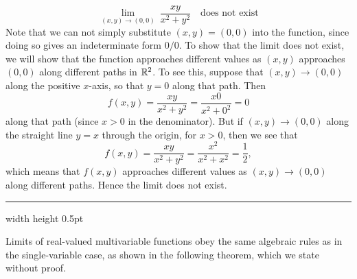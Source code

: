 \begin{exmp}
 \begin{displaymath}
 \lim_{(x,y) \to (0,0)}~ \frac{xy}{x^2 + y^2} \text{~~~does not exist}
 \end{displaymath}
 Note that we can not simply substitute $(x,y) = (0,0)$ into the function, since doing so gives an indeterminate
 form $0/0$. To show that the limit does not exist, we will show that the function approaches different values as
 $(x,y)$ approaches $(0,0)$ along different paths in $\mathbb{R}^{2}$.
 To see this, suppose that $(x,y) \rightarrow (0,0)$ along the positive $x$-axis, so that $y = 0$ along that path. Then
 \begin{displaymath}
  f(x,y) = \frac{xy}{x^2 + y^2} = \frac{x 0}{x^2 + 0^2} = 0
 \end{displaymath}
 along that path (since $x > 0$ in the denominator). But if
 $(x,y) \rightarrow (0,0)$ along the straight line $y = x$ through the origin, for $x > 0$, then we see that
 \begin{displaymath}
  f(x,y) = \frac{xy}{x^2 + y^2} = \frac{x^2}{x^2 + x^2} = \frac{1}{2},
 \end{displaymath}
 which means that $f(x,y)$ approaches different values as $(x,y) \rightarrow (0,0)$ along different paths. Hence the
 limit does not exist.
\end{exmp}
\hrule width \textwidth height 0.5pt
\vspace{4mm}

Limits of real-valued multivariable functions obey the same algebraic rules as in the single-variable case, as shown
in the following theorem, which we state without proof.

